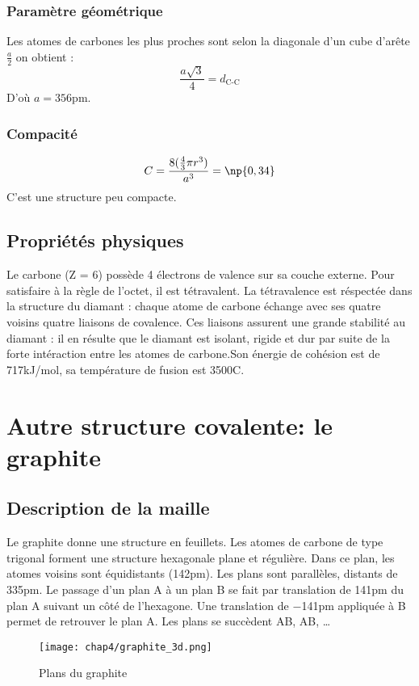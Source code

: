 \subsubsection{Paramètre géométrique}
Les atomes de carbones les plus proches sont selon la diagonale d’un cube d’arête
$\frac{a}{2}$ on obtient :
\begin{equation}
    \frac{a\sqrt{3}}{4} = d_\text{C-C}
\end{equation}
D'où $a = 356$pm.

\subsubsection{Compacité}
\begin{equation}
    C = \frac{8(\frac{4}{3}\pi r^3)}{a^3} = \np{0,34}
\end{equation}
C'est une structure peu compacte.


\subsection{Propriétés physiques}
Le carbone (Z = 6) possède 4 électrons de valence sur sa couche externe. Pour
satisfaire à la règle de l’octet, il est tétravalent. La tétravalence est réspectée dans la structure
du diamant : chaque atome de carbone échange avec ses quatre voisins quatre liaisons
de covalence. Ces liaisons assurent une grande stabilité au diamant : il en résulte que
le diamant est isolant, rigide et dur par suite de la forte intéraction entre les atomes de
carbone.Son énergie 
de cohésion est de 717kJ/mol, sa température 
de fusion est 3500\degre C.


\section{Autre structure covalente: le graphite}
\subsection{Description de la maille}
Le graphite donne une structure en feuillets. Les atomes de carbone de type trigonal
forment une structure hexagonale plane et régulière. Dans ce plan, les atomes voisins
sont équidistants (142pm). Les plans sont parallèles, distants de 335pm. Le passage
d’un plan A à un plan B se fait par translation de 141pm du plan A suivant un côté de
l’hexagone. Une translation de $-$141pm appliquée à B permet de retrouver le plan A.
Les plans se succèdent AB, AB, \dots
\begin{figure}
    \centering
    \texttt{[image: chap4/graphite\_3d.png]}
    \caption{Plans du graphite}\label{fig:4_graphite_3d}
\end{figure}


